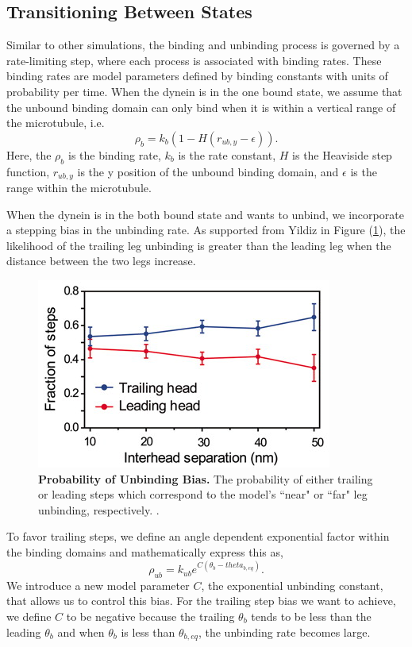 \subsection{Transitioning Between States}

Similar to other simulations, the binding and unbinding process is governed by a rate-limiting step, where each process is associated with binding rates. These binding rates are model parameters defined by binding constants with units of probability per time. When the dynein is in the one bound state, we assume that the unbound binding domain can only bind when it is within a vertical range of the microtubule, i.e.
\begin{equation}
	\rho_b=k_b(1-H(r_{ub,y}-\epsilon)).
\end{equation} 
Here, the $\rho_b$ is the binding rate, $k_b$ is the rate constant, $H$ is the Heaviside step function, $r_{ub,y}$ is the y position of the unbound binding domain, and $\epsilon$ is the range within the microtubule.

When the dynein is in the both bound state and wants to unbind, we incorporate a stepping bias in the unbinding rate. As supported from Yildiz in Figure (\ref{fig:trailingbias}), the likelihood of the trailing leg unbinding is greater than the leading leg when the distance between the two legs increase. 


\begin{figure}[H]
	\centering
	\includegraphics[width=0.6\columnwidth]{Figures/trailingbias.png}
	\caption[Probability of Unbinding Bias]{\textbf{Probability of Unbinding Bias.} The probability of either trailing or leading steps which correspond to the model's ``near" or ``far" leg unbinding, respectively. \cite{Dewitt2012}.}
	\label{fig:trailingbias}
\end{figure}

To favor trailing steps, we define an angle dependent exponential factor within the binding domains and mathematically express this as,
\begin{equation}
	\rho_{ub}=k_{ub}e^{C(\theta_b-theta_{b,eq})}.
\end{equation}
We introduce a new model parameter $C$, the exponential unbinding constant, that allows us to control this bias. For the trailing step bias we want to achieve, we define $C$ to be negative because the trailing $\theta_b$ tends to be less than the leading $\theta_b$ and  when $\theta_b$ is less than $\theta_{b,eq}$, the unbinding rate becomes large.


